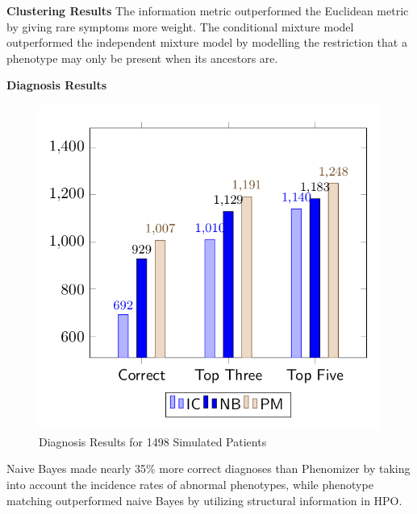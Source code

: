 \documentclass[final]{beamer} %
\begin{document}
\begin{frame}{}
\begin{columns}[T]
\begin{column}{0.3\linewidth}
{\begin{block}{\Huge \textbf{Clustering Results}}
       The information metric outperformed the Euclidean metric by
       giving rare symptoms more weight. The conditional mixture model
       outperformed the independent mixture model by modelling the
       restriction that a phenotype may only be present when its
       ancestors are.
     \end{block}
     \vfill
     \begin{block}{\Huge \textbf{Diagnosis Results}}
       \begin{figure}
         \centering
         \includegraphics[width=.6\textwidth]{sim_patients}
         \vspace{0.5cm}
         \caption*{\large Diagnosis Results for 1498 Simulated
           Patients}
       \end{figure}
       \Large Naive Bayes made nearly 35\% more correct diagnoses than
       Phenomizer by taking into account the incidence rates of
       abnormal phenotypes, while phenotype matching outperformed
       naive Bayes by utilizing structural information in HPO.

     \end{block}
   }
 \end{column}

\end{columns}
\end{frame}
\end{document}

